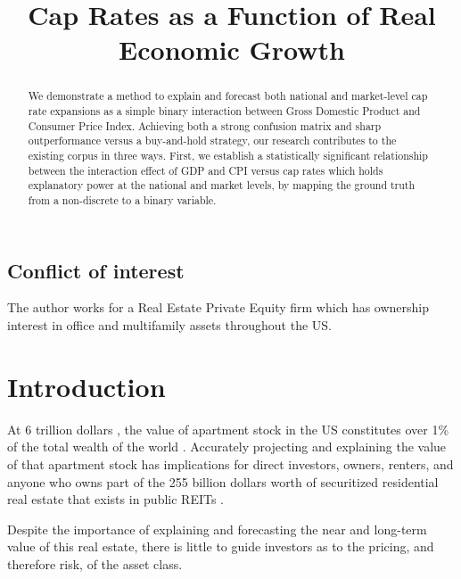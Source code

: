 \subsection{Conflict of interest}
The author works for a Real Estate Private Equity firm which has ownership interest in  office and multifamily assets throughout the US. 





\pagebreak
\setlength{\parindent}{4em}
\setlength{\parskip}{1em}

\title{Cap Rates as a Function of Real Economic Growth}
\begin{abstract} 

We demonstrate a method to explain and forecast both national and market-level cap rate expansions as a simple binary  interaction between Gross Domestic Product and Consumer Price Index. Achieving both a strong confusion matrix and sharp outperformance versus a buy-and-hold strategy, our research contributes to the existing corpus in three ways. First, we establish a statistically significant relationship between the interaction effect of GDP and CPI versus cap rates which holds explanatory power at the national and market levels, by mapping the ground truth from a non-discrete to a binary variable.
\end{abstract}



\section{Introduction}
At 6 trillion dollars \citep*{nmhc}, the value of apartment stock in the US constitutes over 1\% of the total wealth of the world \citep*{williams_2021}. Accurately projecting and explaining the value of that apartment stock has implications for direct investors, owners, renters, and anyone who owns part of the 255 billion dollars worth of securitized residential real estate that exists in public REITs \citep*{nareit_2022}. 

Despite the importance of explaining and forecasting the near and long-term value of this real estate, there is little to guide investors as to the pricing, and therefore risk, of the asset class.

